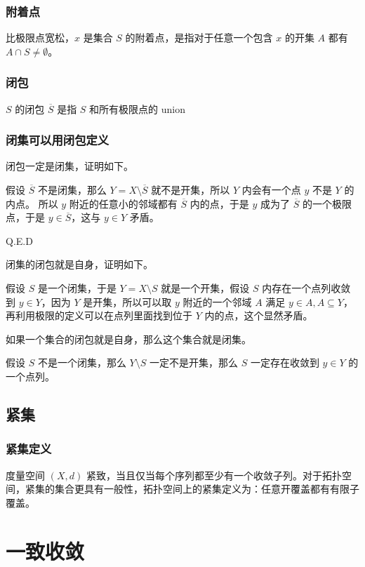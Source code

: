 \subsubsection{附着点}

比极限点宽松，$x$ 是集合 $S$ 的附着点，是指对于任意一个包含 $x$ 的开集 $A$ 都有 $A \cap S \ne \emptyset$。

\subsubsection{闭包}
$S$ 的闭包 $\overline{S}$ 是指 $S$ 和所有极限点的 union

\subsubsection{闭集可以用闭包定义}

闭包一定是闭集，证明如下。

假设 $\overline{S}$ 不是闭集，那么 $ Y = X \setminus \overline{S}$ 就不是开集，所以 $Y$ 内会有一个点 $y$ 不是 $ Y$ 的内点。
所以 $y$ 附近的任意小的邻域都有 $ \overline{S}$ 内的点，于是 $y$ 成为了 $\overline{S}$ 的一个极限点，于是 $y \in \overline{S}$，这与 $y \in Y$ 矛盾。

Q.E.D

闭集的闭包就是自身，证明如下。

假设 $S$ 是一个闭集，于是 $Y = X \setminus S$ 就是一个开集，假设 $S$ 内存在一个点列收敛到 $y \in Y$，因为 $Y$ 是开集，所以可以取 $y$ 附近的一个邻域 $A$ 满足 
$ y \in A, A \subseteq Y $，再利用极限的定义可以在点列里面找到位于 $Y$ 内的点，这个显然矛盾。

如果一个集合的闭包就是自身，那么这个集合就是闭集。

假设 $S$ 不是一个闭集，那么 $ Y \setminus S$ 一定不是开集，那么 $ S $ 一定存在收敛到 $ y \in Y$ 的一个点列。 

\subsection{紧集}

\subsubsection{紧集定义}

度量空间 $(X,d)$ 紧致，当且仅当每个序列都至少有一个收敛子列。对于拓扑空间，紧集的集合更具有一般性，拓扑空间上的紧集定义为：任意开覆盖都有有限子覆盖。


\section{一致收敛}

